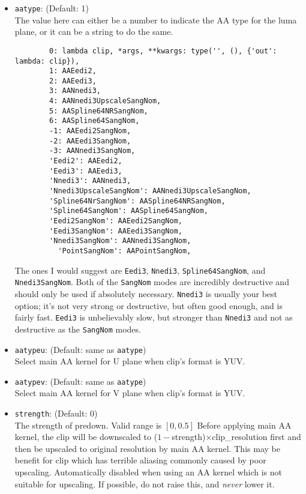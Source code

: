 \documentclass{scrartcl}
\begin{document}
\begin{itemize}
\item \texttt{aatype}: (Default: 1)\\
The value here can either be a number to indicate the AA type for the luma plane, or it can be a string to do the same.
\begin{lstlisting}
        0: lambda clip, *args, **kwargs: type('', (), {'out': lambda: clip}),
        1: AAEedi2,
        2: AAEedi3,
        3: AANnedi3,
        4: AANnedi3UpscaleSangNom,
        5: AASpline64NRSangNom,
        6: AASpline64SangNom,
        -1: AAEedi2SangNom,
        -2: AAEedi3SangNom,
        -3: AANnedi3SangNom,
        'Eedi2': AAEedi2,
        'Eedi3': AAEedi3,
        'Nnedi3': AANnedi3,
        'Nnedi3UpscaleSangNom': AANnedi3UpscaleSangNom,
        'Spline64NrSangNom': AASpline64NRSangNom,
        'Spline64SangNom': AASpline64SangNom,
        'Eedi2SangNom': AAEedi2SangNom,
        'Eedi3SangNom': AAEedi3SangNom,
        'Nnedi3SangNom': AANnedi3SangNom,
		  'PointSangNom': AAPointSangNom,
\end{lstlisting}
The ones I would suggest are \texttt{Eedi3}, \texttt{Nnedi3}, \texttt{Spline64SangNom}, and \texttt{Nnedi3SangNom}.  Both of the \texttt{SangNom} modes are incredibly destructive and should only be used if absolutely necessary.  \texttt{Nnedi3} is usually your best option; it's not very strong or destructive, but often good enough, and is fairly fast.  \texttt{Eedi3} is unbelievably slow, but stronger than \texttt{Nnedi3} and not as destructive as the \texttt{SangNom} modes.

\item \texttt{aatypeu}: (Default: same as \texttt{aatype})\\
    Select main AA kernel for U plane when clip's format is YUV. 

\item \texttt{aatypev}: (Default: same as \texttt{aatype})\\ 
    Select main AA kernel for V plane when clip's format is YUV. 

\item \texttt{strength}: (Default: 0)\\
    The strength of predown. Valid range is $[0, 0.5]$ 
	Before applying main AA kernel, the clip will be downscaled to ($1-$strength)$\times$clip\_resolution first
	and then be upscaled to original resolution by main AA kernel. This may be benefit for clip
	which has terrible aliasing commonly caused by poor upscaling. 
	Automatically disabled when using an AA kernel which is not suitable for upscaling.  If possible, do not raise this, and \textit{never} lower it.


\end{itemize}
\end{document}
